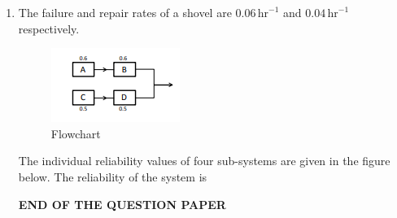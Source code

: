 \documentclass[journal,12pt,onecolumn]{IEEEtran}
\theoremstyle{remark}
\begin{document}
\begin{enumerate}
\hfill{}
\item  The failure and repair rates of a shovel are 
$0.06 \,\text{hr}^{-1}$ and $0.04 \,\text{hr}^{-1}$ respectively. 
\begin{figure}[H]
  \centering
  \includegraphics[width=0.4\columnwidth]{figs/flow.png}
  \caption{Flowchart}
  \label{fi}
\end{figure}
The individual reliability values of four sub-systems are given in the figure below. The reliability of
the system is
\begin{center}
\Large\textbf{{END OF THE QUESTION PAPER}}
\end{center}
\end{enumerate}
\end{document}

